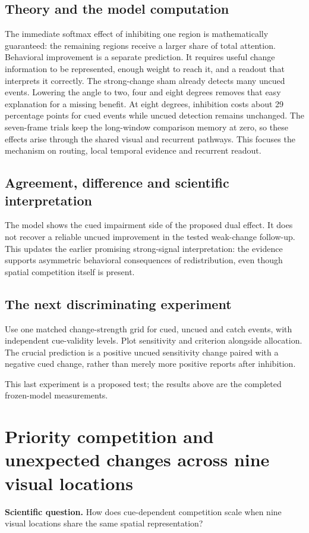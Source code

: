 \documentclass[11pt]{article}
\begin{document}
\subsection{Theory and the model computation}
The immediate softmax effect of inhibiting one region is mathematically guaranteed: the remaining regions receive a larger share of total attention. Behavioral improvement is a separate prediction. It requires useful change information to be represented, enough weight to reach it, and a readout that interprets it correctly. The strong-change sham already detects many uncued events. Lowering the angle to two, four and eight degrees removes that easy explanation for a missing benefit. At eight degrees, inhibition costs about 29 percentage points for cued events while uncued detection remains unchanged. The seven-frame trials keep the long-window comparison memory at zero, so these effects arise through the shared visual and recurrent pathways. This focuses the mechanism on routing, local temporal evidence and recurrent readout.

\subsection{Agreement, difference and scientific interpretation}
The model shows the cued impairment side of the proposed dual effect. It does not recover a reliable uncued improvement in the tested weak-change follow-up. This updates the earlier promising strong-signal interpretation: the evidence supports asymmetric behavioral consequences of redistribution, even though spatial competition itself is present.

\subsection{The next discriminating experiment}
Use one matched change-strength grid for cued, uncued and catch events, with independent cue-validity levels. Plot sensitivity and criterion alongside allocation. The crucial prediction is a positive uncued sensitivity change paired with a negative cued change, rather than merely more positive reports after inhibition.

This last experiment is a proposed test; the results above are the completed frozen-model measurements.
\clearpage\section{Priority competition and unexpected changes across nine visual locations}
\textbf{Scientific question.} How does cue-dependent competition scale when nine visual locations share the same spatial representation?
\end{document}
